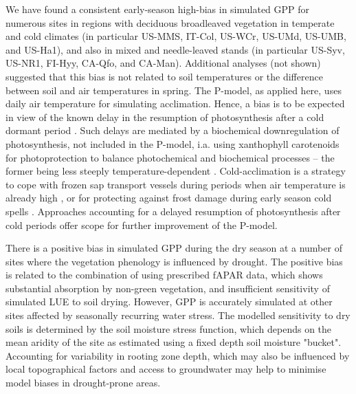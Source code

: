 \documentclass[gmd, manuscript]{copernicus}
\begin{document}
We have found a consistent early-season high-bias in simulated GPP for numerous sites in regions with deciduous broadleaved vegetation in temperate and cold climates (in particular US-MMS, IT-Col, US-WCr, US-UMd, US-UMB, and US-Ha1), and also in mixed and needle-leaved stands (in particular US-Syv, US-NR1, FI-Hyy, CA-Qfo, and CA-Man). Additional analyses (not shown) suggested that this bias is not related to soil temperatures or the difference between soil and air temperatures in spring. The P-model, as applied here, uses daily air temperature for simulating acclimation. Hence, a bias is to be expected in view of the known delay in the resumption of photosynthesis after a cold dormant period \citep{huner93, oquist03, adams04, verhoeven14, bowling18}. Such delays are mediated by a biochemical downregulation of photosynthesis, not included in the P-model, i.a. using xanthophyll carotenoids for photoprotection \citep{adams04} to balance photochemical and biochemical processes -- the former being less steeply temperature-dependent \citep{oquist03}. Cold-acclimation is a strategy to cope with frozen sap transport vessels during periods when air temperature is already high \citep{bowling18}, or for protecting against frost damage during early season cold spells \citep{vitasse14}. Approaches accounting for a delayed resumption of photosynthesis after cold periods \citep{pelkonen80, bergh98, makela04} offer scope for further improvement of the P-model.

There is a positive bias in simulated GPP during the dry season at a number of sites where the vegetation phenology is influenced by drought. The positive bias is related to the combination of using prescribed fAPAR data, which shows substantial absorption by non-green vegetation, and insufficient sensitivity of simulated LUE to soil drying. However, GPP is accurately simulated at other sites affected by seasonally recurring water stress. The modelled sensitivity to dry soils is determined by the soil moisture stress function, which depends on the mean aridity of the site as estimated using a fixed depth soil moisture "bucket". Accounting for variability in rooting zone depth, which may also be influenced by local topographical factors and access to groundwater \citep{fan13sci, fan17pnas} may help to minimise model biases in drought-prone areas.
\end{document}
